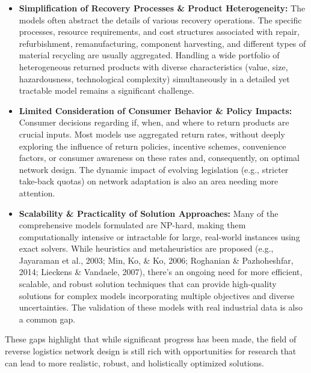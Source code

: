 \begin{itemize}
    \item \textbf{Simplification of Recovery Processes \& Product Heterogeneity:}
        The models often abstract the details of various recovery operations. The specific processes, resource requirements, and cost structures associated with repair, refurbishment, remanufacturing, component harvesting, and different types of material recycling are usually aggregated. Handling a wide portfolio of heterogeneous returned products with diverse characteristics (value, size, hazardousness, technological complexity) simultaneously in a detailed yet tractable model remains a significant challenge.

    \item \textbf{Limited Consideration of Consumer Behavior \& Policy Impacts:}
        Consumer decisions regarding if, when, and where to return products are crucial inputs. Most models use aggregated return rates, without deeply exploring the influence of return policies, incentive schemes, convenience factors, or consumer awareness on these rates and, consequently, on optimal network design. The dynamic impact of evolving legislation (e.g., stricter take-back quotas) on network adaptation is also an area needing more attention.

    \item \textbf{Scalability \& Practicality of Solution Approaches:}
        Many of the comprehensive models formulated are NP-hard, making them computationally intensive or intractable for large, real-world instances using exact solvers. While heuristics and metaheuristics are proposed (e.g., Jayaraman et al., 2003; Min, Ko, \& Ko, 2006; Roghanian \& Pazhoheshfar, 2014; Lieckens \& Vandaele, 2007), there's an ongoing need for more efficient, scalable, and robust solution techniques that can provide high-quality solutions for complex models incorporating multiple objectives and diverse uncertainties. The validation of these models with real industrial data is also a common gap.
\end{itemize}
These gaps highlight that while significant progress has been made, the field of reverse logistics network design is still rich with opportunities for research that can lead to more realistic, robust, and holistically optimized solutions.